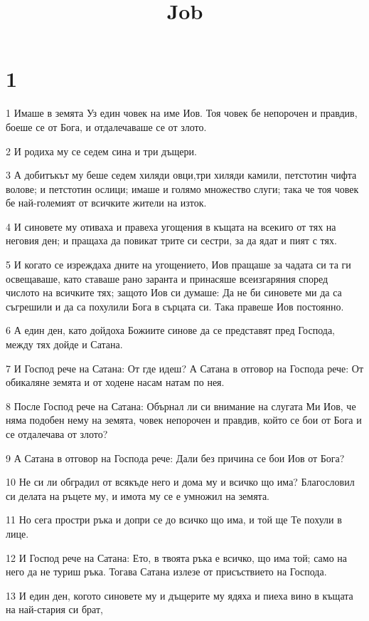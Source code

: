 

\title{Job}


\chapter{1}

\par 1 Имаше в земята Уз един човек на име Иов. Тоя човек бе непорочен и правдив, боеше се от Бога, и отдалечаваше се от злото.
\par 2 И родиха му се седем сина и три дъщери.
\par 3 А добитъкът му беше седем хиляди овци,три хиляди камили, петстотин чифта волове; и петстотин ослици; имаше и голямо множество слуги; така че тоя човек бе най-големият от всичките жители на изток.
\par 4 И синовете му отиваха и правеха угощения в къщата на всекиго от тях на неговия ден; и пращаха да повикат трите си сестри, за да ядат и пият с тях.
\par 5 И когато се изреждаха дните на угощението, Иов пращаше за чадата си та ги освещаваше, като ставаше рано заранта и принасяше всеизгаряния според числото на всичките тях; защото Иов си думаше: Да не би синовете ми да са съгрешили и да са похулили Бога в сърцата си. Така правеше Иов постоянно.
\par 6 А един ден, като дойдоха Божиите синове да се представят пред Господа, между тях дойде и Сатана.
\par 7 И Господ рече на Сатана: От где идеш? А Сатана в отговор на Господа рече: От обикаляне земята и от ходене насам натам по нея.
\par 8 После Господ рече на Сатана: Обърнал ли си внимание на слугата Ми Иов, че няма подобен нему на земята, човек непорочен и правдив, който се бои от Бога и се отдалечава от злото?
\par 9 А Сатана в отговор на Господа рече: Дали без причина се бои Иов от Бога?
\par 10 Не си ли обградил от всякъде него и дома му и всичко що има? Благословил си делата на ръцете му, и имота му се е умножил на земята.
\par 11 Но сега простри ръка и допри се до всичко що има, и той ще Те похули в лице.
\par 12 И Господ рече на Сатана: Ето, в твоята ръка е всичко, що има той; само на него да не туриш ръка. Тогава Сатана излезе от присъствието на Господа.
\par 13 И един ден, когото синовете му и дъщерите му ядяха и пиеха вино в къщата на най-стария си брат,
